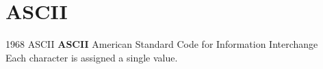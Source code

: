 \documentclass[../index.tex]{subfiles}
\begin{document}
\renewcommand{\sectiontitle}{ASCII}
\section{\sectiontitle}
%

\renewcommand{\currenttitle}{1968 \textendash{} ASCII}
\begin{frame}{\currenttitle}
%
  \textbf{ASCII} \textendash{} American Standard Code for Information Interchange \\
  \vspace*{1em}
  Each character is assigned a single value.
\end{frame}
\end{document}
